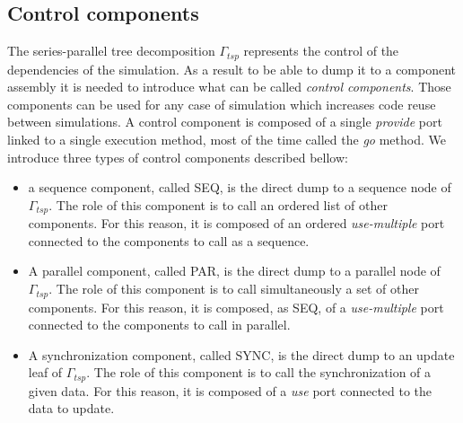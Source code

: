\subsection{Control components}
The series-parallel tree decomposition $\Gamma_{tsp}$ represents the control of the dependencies of the simulation. As a result to be able to dump it to a component assembly it is needed to introduce what can be called \emph{control components}. Those components can be used for any case of simulation which increases code reuse between simulations. A control component is composed of a single \emph{provide} port linked to a single execution method, most of the time called the \emph{go} method. We introduce three types of control components described bellow:

\begin{itemize}
\item a sequence component, called SEQ, is the direct dump to a sequence node of $\Gamma_{tsp}$. The role of this component is to call an ordered list of other components. For this reason, it is composed of an ordered \emph{use-multiple} port connected to the components to call as a sequence.


\item A parallel component, called PAR, is the direct dump to a parallel node of $\Gamma_{tsp}$. The role of this component is to call simultaneously a set of other components. For this reason, it is composed, as SEQ, of a \emph{use-multiple} port connected to the components to call in parallel.


\item A synchronization component, called SYNC, is the direct dump to an update leaf of $\Gamma_{tsp}$. The role of this component is to call the synchronization of a given data. For this reason, it is composed of a \emph{use} port connected to the data to update.

\end{itemize}


